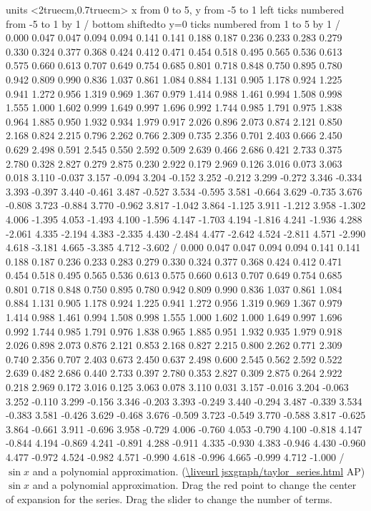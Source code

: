 \figure
\texonly
\vbox{\beginpicture
\normalgraphs
\ninepoint
\setcoordinatesystem units <2truecm,0.7truecm>
\setplotarea x from 0 to 5, y from -5 to 1
\axis left ticks numbered from -5 to 1 by 1 /
\axis bottom shiftedto y=0 ticks numbered from 1 to 5 by 1 /
\setquadratic
{} 0.000 0.047 0.047 0.094 0.094 0.141 0.141 0.188 0.187 
0.236 0.233 0.283 0.279 0.330 0.324 0.377 0.368 0.424 0.412 
0.471 0.454 0.518 0.495 0.565 0.536 0.613 0.575 0.660 0.613 
0.707 0.649 0.754 0.685 0.801 0.718 0.848 0.750 0.895 0.780 
0.942 0.809 0.990 0.836 1.037 0.861 1.084 0.884 1.131 0.905 
1.178 0.924 1.225 0.941 1.272 0.956 1.319 0.969 1.367 0.979 
1.414 0.988 1.461 0.994 1.508 0.998 1.555 1.000 1.602 0.999 
1.649 0.997 1.696 0.992 1.744 0.985 1.791 0.975 1.838 0.964 
1.885 0.950 1.932 0.934 1.979 0.917 2.026 0.896 2.073 0.874 
2.121 0.850 2.168 0.824 2.215 0.796 2.262 0.766 2.309 0.735 
2.356 0.701 2.403 0.666 2.450 0.629 2.498 0.591 2.545 0.550 
2.592 0.509 2.639 0.466 2.686 0.421 2.733 0.375 2.780 0.328 
2.827 0.279 2.875 0.230 2.922 0.179 2.969 0.126 3.016 0.073 
3.063 0.018 3.110 -0.037 3.157 -0.094 3.204 -0.152 3.252 -0.212 
3.299 -0.272 3.346 -0.334 3.393 -0.397 3.440 -0.461 3.487 -0.527 
3.534 -0.595 3.581 -0.664 3.629 -0.735 3.676 -0.808 3.723 -0.884 
3.770 -0.962 3.817 -1.042 3.864 -1.125 3.911 -1.212 3.958 -1.302 
4.006 -1.395 4.053 -1.493 4.100 -1.596 4.147 -1.703 4.194 -1.816 
4.241 -1.936 4.288 -2.061 4.335 -2.194 4.383 -2.335 4.430 -2.484 
4.477 -2.642 4.524 -2.811 4.571 -2.990 4.618 -3.181 4.665 -3.385 
4.712 -3.602 /
 0.000 0.047 0.047 0.094 0.094 0.141 0.141 0.188 0.187 
0.236 0.233 0.283 0.279 0.330 0.324 0.377 0.368 0.424 0.412 
0.471 0.454 0.518 0.495 0.565 0.536 0.613 0.575 0.660 0.613 
0.707 0.649 0.754 0.685 0.801 0.718 0.848 0.750 0.895 0.780 
0.942 0.809 0.990 0.836 1.037 0.861 1.084 0.884 1.131 0.905 
1.178 0.924 1.225 0.941 1.272 0.956 1.319 0.969 1.367 0.979 
1.414 0.988 1.461 0.994 1.508 0.998 1.555 1.000 1.602 1.000 
1.649 0.997 1.696 0.992 1.744 0.985 1.791 0.976 1.838 0.965 
1.885 0.951 1.932 0.935 1.979 0.918 2.026 0.898 2.073 0.876 
2.121 0.853 2.168 0.827 2.215 0.800 2.262 0.771 2.309 0.740 
2.356 0.707 2.403 0.673 2.450 0.637 2.498 0.600 2.545 0.562 
2.592 0.522 2.639 0.482 2.686 0.440 2.733 0.397 2.780 0.353 
2.827 0.309 2.875 0.264 2.922 0.218 2.969 0.172 3.016 0.125 
3.063 0.078 3.110 0.031 3.157 -0.016 3.204 -0.063 3.252 -0.110 
3.299 -0.156 3.346 -0.203 3.393 -0.249 3.440 -0.294 3.487 -0.339 
3.534 -0.383 3.581 -0.426 3.629 -0.468 3.676 -0.509 3.723 -0.549 
3.770 -0.588 3.817 -0.625 3.864 -0.661 3.911 -0.696 3.958 -0.729 
4.006 -0.760 4.053 -0.790 4.100 -0.818 4.147 -0.844 4.194 -0.869 
4.241 -0.891 4.288 -0.911 4.335 -0.930 4.383 -0.946 4.430 -0.960 
4.477 -0.972 4.524 -0.982 4.571 -0.990 4.618 -0.996 4.665 -0.999 
4.712 -1.000 /
\endpicture}
\begincaption
$\sin x$ and a polynomial approximation.
(\expandafter\url\expandafter{\liveurl jsxgraph/taylor_series.html}%
AP\endurl)
\endcaption
\endtexonly
{}
\htmlonly
\begincaption
$\sin x$ and a polynomial approximation.
Drag the red point to change the center of expansion for the
series. Drag the slider to change the number of terms.
\endcaption
\endhtmlonly
\endfigure

